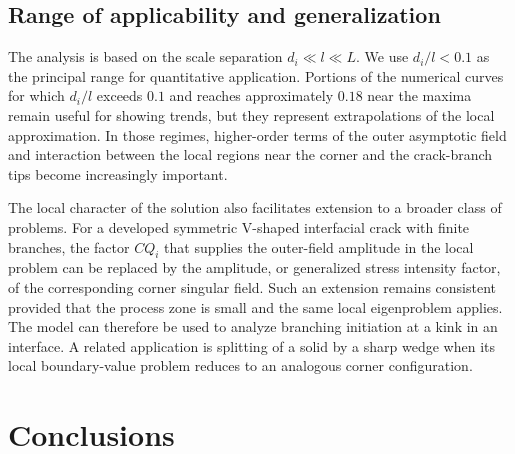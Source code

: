 \documentclass[pdflatex,onecolumn,sn-mathphys-ay]{sn-jnl}
\begin{document}
\subsection{Range of applicability and generalization}
\label{subsec:discussion-scope}

The analysis is based on the scale separation $d_i\ll l\ll L$. We use
$d_i/l<0.1$ as the principal range for quantitative application. Portions
of the numerical curves for which $d_i/l$ exceeds $0.1$ and reaches
approximately $0.18$ near the maxima remain useful for showing trends, but
they represent extrapolations of the local approximation. In those
regimes, higher-order terms of the outer asymptotic field and interaction
between the local regions near the corner and the crack-branch tips become
increasingly important.

The local character of the solution also facilitates extension to a
broader class of problems. For a developed symmetric V-shaped interfacial
crack with finite branches, the factor $CQ_i$ that supplies the outer-field
amplitude in the local problem can be replaced by the amplitude, or
generalized stress intensity factor, of the corresponding corner singular
field. Such an extension remains consistent provided that the process zone
is small and the same local eigenproblem applies. The model can therefore
be used to analyze branching initiation at a kink in an interface. A
related application is splitting of a solid by a sharp wedge when its
local boundary-value problem reduces to an analogous corner configuration.


\section{Conclusions}
\label{sec:conclusions}
\end{document}
